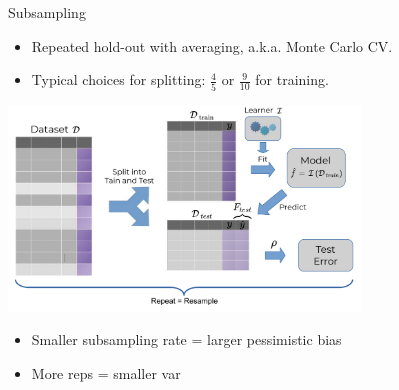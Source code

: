 \documentclass[11pt,compress,t,notes=noshow, xcolor=table]{beamer}
\begin{document}

\begin{vbframe}{Subsampling}

\begin{itemize}
  \item Repeated hold-out with averaging, a.k.a. Monte Carlo CV.
  \item Typical choices for splitting: $\frac{4}{5}$ or $\frac{9}{10}$ for 
  training.
\end{itemize}
\begin{center}
\includegraphics[width=0.7\textwidth]{figure_man/resampling_error.pdf}
\end{center}
\begin{itemize}
  \item Smaller subsampling rate = larger pessimistic bias
  \item More reps = smaller var
\end{itemize}

\end{vbframe}

\end{document}
